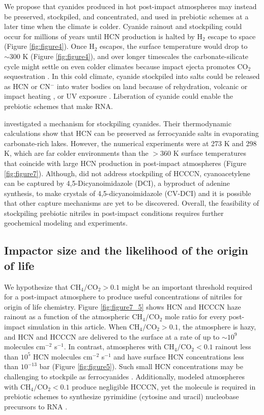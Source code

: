 We propose that cyanides produced in hot post-impact atmospheres may instead be preserved, stockpiled, and concentrated, and used in prebiotic schemes at a later time when the climate is colder. Cyanide rainout and stockpiling could occur for millions of years until HCN production is halted by H$_2$ escape to space (Figure \ref{fig:figure4}). Once H$_2$ escapes, the surface temperature would drop to $\sim 300$ K (Figure \ref{fig:figure4}), and over longer timescales the carbonate-silicate cycle might settle on even colder climates because impact ejecta promotes CO$_2$ sequestration \citep{Kadoya_2020}. In this cold climate, cyanide stockpiled into salts could be released as HCN or CN$^-$ into water bodies on land because of rehydration, volcanic or impact heating \citep{Patel_2015,Sasselov_2020}, or UV exposure \citep{Todd_2022}. Liberation of cyanide could enable the prebiotic schemes that make RNA.

\citet{Toner_2019} investigated a mechanism for stockpiling cyanides. Their thermodynamic calculations show that HCN can be preserved as ferrocyanide salts in evaporating carbonate-rich lakes. However, the \citet{Toner_2019} numerical experiments were at 273 K and 298 K, which are far colder environments than the $> 360$ K surface temperatures that coincide with large HCN production in post-impact atmospheres (Figure \ref{fig:figure7}). Although, \citet{Toner_2019} did not address stockpiling of HCCCN, cyanoacetylene can be captured by 4,5-Dicyanoimidazole (DCI), a byproduct of adenine synthesis, to make crystals of 4,5-dicyanoimidazole (CV-DCI) \citep{Ritson_2022} and it is possible that other capture mechanisms are yet to be discovered. Overall, the feasibility of stockpiling prebiotic nitriles in post-impact conditions requires further geochemical modeling and experiments.

\subsection{Impactor size and the likelihood of the origin of life}

We hypothesize that $\mathrm{CH_4}/\mathrm{CO_2} > 0.1$ might be an important threshold required for a post-impact atmosphere to produce useful concentrations of nitriles for origin of life chemistry. Figure \ref{fig:figure7_5} shows HCN and HCCCN haze rainout as a function of the atmospheric $\mathrm{CH_4}/\mathrm{CO_2}$ mole ratio for every post-impact simulation in this article. When $\mathrm{CH_4}/\mathrm{CO_2} > 0.1$, the atmosphere is hazy, and HCN and HCCCN are delivered to the surface at a rate of up to $\sim 10^9$ molecules cm$^{-2}$ s$^{-1}$. In contrast, atmospheres with $\mathrm{CH_4}/\mathrm{CO_2} < 0.1$ rainout less than $10^5$ HCN molecules cm$^{-2}$ s$^{-1}$ and have surface HCN concentrations less than $10^{-13}$ bar (Figure \ref{fig:figure5}). Such small HCN concentrations may be challenging to stockpile as ferrocyanides \citep{Toner_2019}. Additionally, modeled atmospheres with $\mathrm{CH_4}/\mathrm{CO_2} < 0.1$ produce negligible HCCCN, yet the molecule is required in prebiotic schemes to synthesize pyrimidine (cytosine and uracil) nucleobase precursors to RNA \citep{Powner_2009,Okamura_2019,Becker_2019}.


